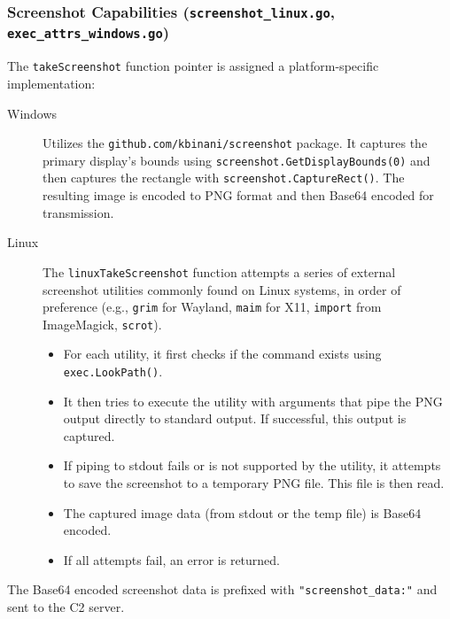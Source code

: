 \subsubsection{Screenshot Capabilities (\texttt{screenshot\_linux.go}, \texttt{exec\_attrs\_windows.go})}
The \texttt{takeScreenshot} function pointer is assigned a platform-specific implementation:
\begin{description}
    \item[Windows] Utilizes the \texttt{github.com/kbinani/screenshot} package. It captures the primary display's bounds using \texttt{screenshot.GetDisplayBounds(0)} and then captures the rectangle with \texttt{screenshot.CaptureRect()}. The resulting image is encoded to PNG format and then Base64 encoded for transmission.
    \item[Linux] The \texttt{linuxTakeScreenshot} function attempts a series of external screenshot utilities commonly found on Linux systems, in order of preference (e.g., \texttt{grim} for Wayland, \texttt{maim} for X11, \texttt{import} from ImageMagick, \texttt{scrot}).
        \begin{itemize}
            \item For each utility, it first checks if the command exists using \texttt{exec.LookPath()}.
            \item It then tries to execute the utility with arguments that pipe the PNG output directly to standard output. If successful, this output is captured.
            \item If piping to stdout fails or is not supported by the utility, it attempts to save the screenshot to a temporary PNG file. This file is then read.
            \item The captured image data (from stdout or the temp file) is Base64 encoded.
            \item If all attempts fail, an error is returned.
        \end{itemize}
\end{description}
The Base64 encoded screenshot data is prefixed with \texttt{"screenshot\_data:"} and sent to the C2 server.

